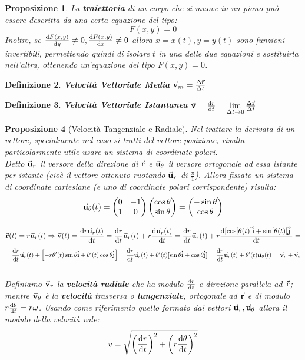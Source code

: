 \documentclass{article}
\newtheorem{defn}{Definizione}[section]
\newtheorem{prop}[defn]{Proposizione}
\newcommand{\then}{\ensuremath{\Rightarrow}}
\renewcommand{\i}{\vu{i}}
\renewcommand{\j}{\vu{j}}
\renewcommand{\v}{\va{v}}
\renewcommand{\u}{\va{u}}
\renewcommand{\r}{\va{r}}
\begin{document}
\begin{prop}
La \textbf{traiettoria} di un corpo che si muove in un piano può essere descritta da una certa equazione del tipo:
\[F(x,y)=0\]
Inoltre, se $\dv{F(x,y)}{y}\neq0,\dv{F(x,y)}{x}\neq0$ allora $x=x(t),y=y(t)$ sono funzioni invertibili, permettendo quindi di isolare $t$ in una delle due equazioni e sostituirla nell'altra, ottenendo un'equazione del tipo $F(x,y)=0$.
\end{prop}

\begin{defn}
\textbf{Velocità Vettoriale Media} $\va{v}_m=\frac{\Delta\r}{\Delta t}$
\end{defn}

\begin{defn}
\textbf{Velocità Vettoriale Istantanea} $\va{v}=\dv{r}{t}=\lim\limits_{\Delta t\to 0}\frac{\Delta\r}{\Delta t}$
\end{defn}

\begin{prop}[Velocità Tangenziale e Radiale]
Nel trattare la derivata di un vettore, specialmente nel caso si tratti del vettore posizione, risulta particolarmente utile usare un sistema di coordinate polari.\\

Detto $\u_r$ il versore della direzione di $\r$ e $\u_\theta$ il versore ortogonale ad essa istante per istante (cioè il vettore ottenuto ruotando $\u_r$ di $\frac{\pi}{1}$). Allora fissato un sistema di coordinate cartesiane (e uno di coordinate polari corrispondente) risulta:
\[\u_\theta(t)=\begin{pmatrix}0&-1\\1&0\\\end{pmatrix}\begin{pmatrix}\cos\theta\\\sin\theta\end{pmatrix}=\begin{pmatrix}-\sin\theta\\\cos\theta\\\end{pmatrix}\]

\[\r(t)=r\u_r(t)\then \v(t)=\dv{r\u_r(t)}{t}=\dv{r}{t}\u_r(t)+r\dv{\u_r(t)}{t}=\dv{r}{t}\u_r(t)+r\dv{[\cos[\theta(t)]\i+\sin[\theta(t)]\j]}{t}=\]\[=\dv{r}{t}\u_r(t)+\left[-r\theta'(t)\sin\theta\i+\theta'(t)\cos\theta\j\right]=\dv{r}{t}\u_r(t)+\theta'(t)[\sin\theta\i+\cos\theta\j]=\dv{r}{t}\u_r(t)+\theta'(t)\u_\theta(t)=\v_r+\v_\theta\]\\
\linebreak
Definiamo $\v_r$ la \textbf{velocità radiale} che ha modulo $\dv{r}{t}$ e direzione parallela ad $\r$; mentre $\v_\theta$ è la \textbf{velocità} trasversa o \textbf{tangenziale}, ortogonale ad $\r$ e di modulo $r\dv{\theta}{t}=r\omega$.
Usando come riferimento quello formato dai vettori $\u_r,\u_\theta$ allora il modulo della velocità vale:
\[v=\sqrt{\left(\dv{r}{t}\right)^2+\left(r\dv{\theta}{t}\right)^2}\]
\end{prop}
\end{document}

